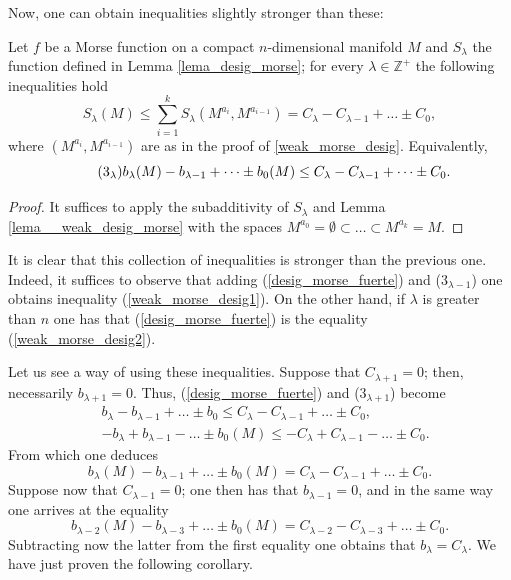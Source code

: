 Now, one can obtain inequalities slightly stronger than these:

\begin{theorem}
    Let $f$ be a Morse function on a compact $n$-dimensional manifold $M$ and $S_{\lambda}$ the function defined in Lemma \ref{lema_desig_morse}; for every $\lambda\in \mathbb{Z}^+$ the following inequalities hold
    \begin{equation*}
        S_{\lambda}(M)\le \sum_{i=1}^k S_{\lambda}(M^{a_i},M^{a_{i-1}}) = C_{\lambda}-C_{\lambda-1}+\dots\pm C_0,
    \end{equation*}
    where $(M^{a_i},M^{a_{i-1}})$ are as in the proof of \ref{weak_morse_desig}. Equivalently,
    \begin{equation}
    \label{desig_morse_fuerte}
    \tag{$3_{\lambda}$}
        b_{\lambda}(M)-b_{\lambda-1}+\dots\pm b_0(M) \le C_{\lambda}-C_{\lambda-1}+\dots\pm C_0. %
    \end{equation}
\end{theorem}
\begin{proof}
    It suffices to apply the subadditivity of $S_{\lambda}$ and Lemma \ref{lema__weak_desig_morse} with the spaces $M^{a_0}=\emptyset \subset \dots \subset M^{a_k}=M$.

\end{proof}

It is clear that this collection of inequalities is stronger than the previous one. Indeed, it suffices to observe that adding (\ref{desig_morse_fuerte}) and ($3_{\lambda-1}$) one obtains inequality (\ref{weak_morse_desig1}). On the other hand, if $\lambda$ is greater than $n$ one has that (\ref{desig_morse_fuerte}) is the equality (\ref{weak_morse_desig2}).

\bigskip
Let us see a way of using these inequalities. Suppose that $C_{\lambda+1}=0$; then, necessarily $b_{\lambda+1}=0$. Thus, (\ref{desig_morse_fuerte}) and ($3_{\lambda+1}$) become
\begin{align*}
    &b_{\lambda}-b_{\lambda-1}+\dots\pm b_0 \le C_{\lambda}-C_{\lambda-1}+\dots\pm C_0,\\
    &-b_{\lambda}+b_{\lambda-1}-\dots\pm b_0(M) \le -C_{\lambda}+C_{\lambda-1}-\dots\pm C_0.
\end{align*}
From which one deduces
\begin{equation*}
    b_{\lambda}(M)-b_{\lambda-1}+\dots\pm b_0(M) = C_{\lambda}-C_{\lambda-1}+\dots\pm C_0.
\end{equation*}
Suppose now that $C_{\lambda-1}=0$; one then has that $b_{\lambda-1}=0$, and in the same way one arrives at the equality
\begin{equation*}
    b_{\lambda-2}(M)-b_{\lambda-3}+\dots\pm b_0(M) = C_{\lambda-2}-C_{\lambda-3}+\dots\pm C_0.
\end{equation*}
Subtracting now the latter from the first equality one obtains that $b_{\lambda} = C_{\lambda}$. We have just proven the following corollary.

